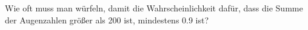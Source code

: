 \begin{exercise}
Wie oft muss man würfeln, damit die Wahrscheinlichkeit dafür, dass die Summe der
Augenzahlen größer als 200 ist, mindestens 0.9 ist?
\end{exercise}
\begin{solution}
\end{solution}
